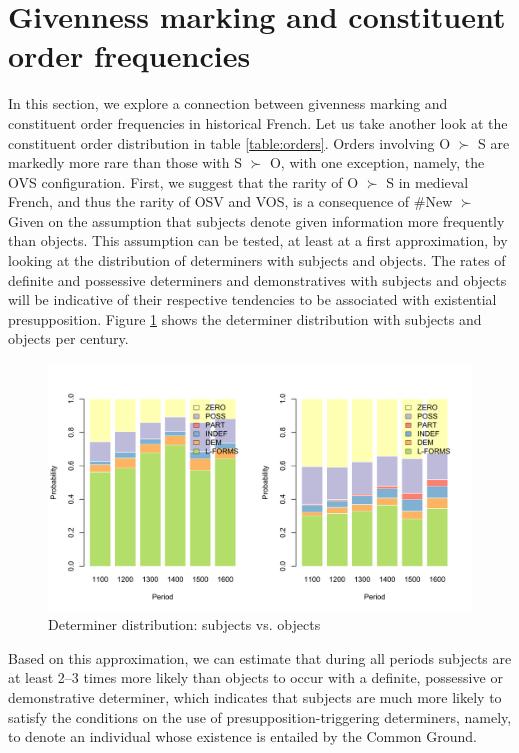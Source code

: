 \documentclass[output=paper,modfonts,nonflat]{langsci/langscibook}
\begin{document}
\section{Givenness marking and constituent order frequencies}
\label{section:orders}

In this section, we explore a connection between givenness marking and constituent order frequencies in historical French. Let us take another look at the constituent order distribution in table \ref{table:orders}. Orders involving O $\succ$ S are markedly more rare than those with S $\succ$ O, with one exception, namely, the OVS configuration. First, we suggest that the rarity of O $\succ$ S in medieval French, and thus the rarity of OSV and VOS, is a consequence of \#New $\succ$ Given on the assumption that subjects denote given information more frequently than objects. This assumption can be tested, at least at a first approximation, by looking at the distribution of determiners with subjects and objects. The rates of definite and possessive determiners and demonstratives with subjects and objects will be indicative of their respective tendencies to be associated with existential presupposition. Figure \ref{figure:determiners} shows the determiner distribution with subjects and objects per century.

\begin{figure}
\includegraphics[scale = 0.45]{figures/determiners.pdf}
\caption{Determiner distribution: subjects vs. objects}\label{figure:determiners}
\end{figure}

Based on this approximation, we can estimate that during all periods subjects are at least 2--3 times more likely than objects to occur with a definite, possessive or demonstrative determiner, which indicates that subjects are much more likely to satisfy the conditions on the use of presupposition-triggering determiners, namely, to denote an individual whose existence is entailed by the Common Ground. 
\end{document}
